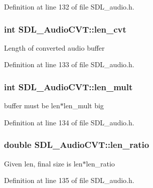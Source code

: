 Definition at line 132 of file S\+D\+L\+\_\+audio.\+h.

\hypertarget{struct_s_d_l___audio_c_v_t_a5c60163f34d1947e5b166c23aba9879d}{}
\subsubsection[{len\+\_\+cvt}]{\setlength{\rightskip}{0pt plus 5cm}int S\+D\+L\+\_\+\+Audio\+C\+V\+T\+::len\+\_\+cvt}\label{struct_s_d_l___audio_c_v_t_a5c60163f34d1947e5b166c23aba9879d}
Length of converted audio buffer 

Definition at line 133 of file S\+D\+L\+\_\+audio.\+h.

\hypertarget{struct_s_d_l___audio_c_v_t_ac9662d47cf2348b82b27b151150116b0}{}
\subsubsection[{len\+\_\+mult}]{\setlength{\rightskip}{0pt plus 5cm}int S\+D\+L\+\_\+\+Audio\+C\+V\+T\+::len\+\_\+mult}\label{struct_s_d_l___audio_c_v_t_ac9662d47cf2348b82b27b151150116b0}
buffer must be len$\ast$len\+\_\+mult big 

Definition at line 134 of file S\+D\+L\+\_\+audio.\+h.

\hypertarget{struct_s_d_l___audio_c_v_t_a5628ff5ccf711de9d77c0a4a9f57d2f0}{}
\subsubsection[{len\+\_\+ratio}]{\setlength{\rightskip}{0pt plus 5cm}double S\+D\+L\+\_\+\+Audio\+C\+V\+T\+::len\+\_\+ratio}\label{struct_s_d_l___audio_c_v_t_a5628ff5ccf711de9d77c0a4a9f57d2f0}
Given len, final size is len$\ast$len\+\_\+ratio 

Definition at line 135 of file S\+D\+L\+\_\+audio.\+h.

\hypertarget{struct_s_d_l___audio_c_v_t_ac600a035a48df05e14d3712fd6953ad4}{}
